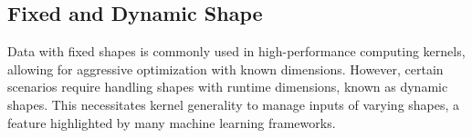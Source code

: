 \subsection*{Fixed and Dynamic Shape}

Data with fixed shapes is commonly used in high-performance computing kernels, allowing for aggressive optimization with known dimensions. However, certain scenarios require handling shapes with runtime dimensions, known as dynamic shapes. This necessitates kernel generality to manage inputs of varying shapes, a feature highlighted by many machine learning frameworks.
